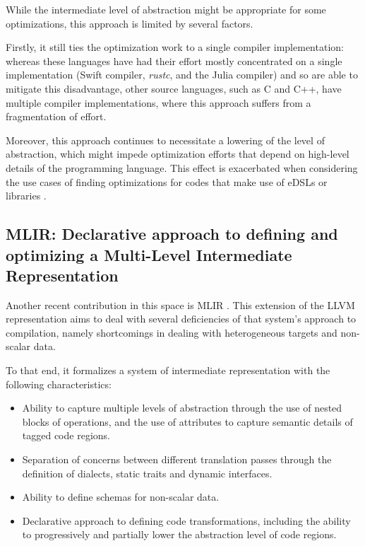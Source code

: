 While the intermediate level of abstraction might be appropriate for some optimizations, this approach is limited by several factors.

Firstly, it still ties the optimization work to a single compiler implementation: whereas these languages have had their effort mostly concentrated on a single implementation (Swift compiler, \textit{rustc}, and the Julia compiler) and so are able to mitigate this disadvantage, other source languages, such as C and C++, have multiple compiler implementations, where this approach suffers from a fragmentation of effort.

Moreover, this approach continues to necessitate a lowering of the level of abstraction, which might impede optimization efforts that depend on high-level details of the programming language. This effect is exacerbated when considering the use cases of finding optimizations for codes that make use of eDSLs or libraries \cite{Zangerl2018}.

\subsection{MLIR: Declarative approach to defining and optimizing a Multi-Level Intermediate Representation}

Another recent contribution in this space is MLIR \cite{Lattner2021}. This extension of the LLVM representation aims to deal with several deficiencies of that system's approach to compilation, namely shortcomings in dealing with heterogeneous targets and non-scalar data.

To that end, it formalizes a system of intermediate representation with the following characteristics:

\begin{itemize}
    \item Ability to capture multiple levels of abstraction through the use of nested blocks of operations, and the use of attributes to capture semantic details of tagged code regions.
    \item Separation of concerns between different translation passes through the definition of dialects, static traits and dynamic interfaces.
    \item Ability to define schemas for non-scalar data.
    \item Declarative approach to defining code transformations, including the ability to progressively and partially lower the abstraction level of code regions.
\end{itemize}

